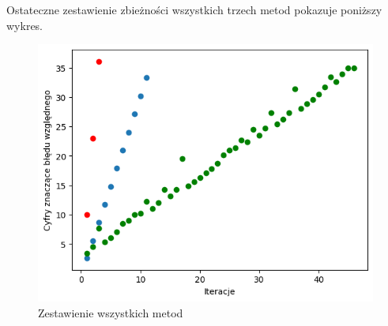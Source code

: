 \documentclass[11pt,wide]{mwart}
\begin{document}
Ostateczne zestawienie zbieżności wszystkich trzech metod pokazuje poniższy wykres.\\
\begin{figure}[H]
	\begin{center}
	\includegraphics[scale=0.6]{zestawienie_3}
	\end{center}
	\caption{Zestawienie wszystkich metod}
\end{figure}
\end{document}
